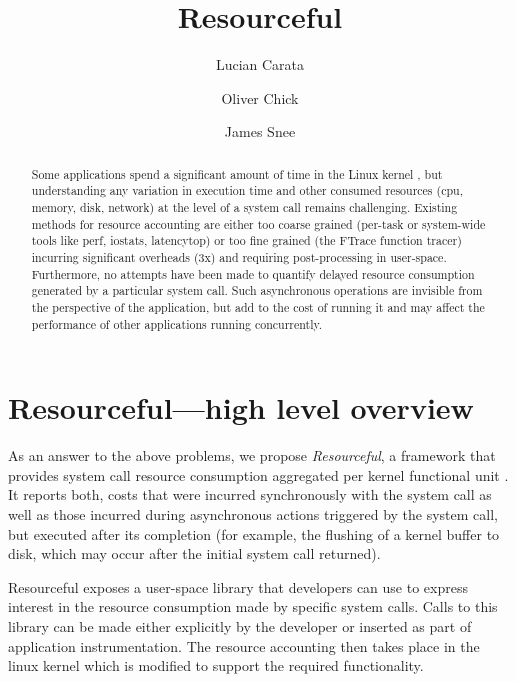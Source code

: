 \documentclass[12pt]{article}
\title{Resourceful}
\author{Lucian Carata \and Oliver Chick \and James Snee}
\date{}
\begin{document}
\maketitle{}

\begin{abstract}
Some applications spend a significant amount of time in the Linux kernel \cite{kernelscale}, but understanding any variation in execution time and other consumed resources (cpu, memory, disk, network) at the level of a system call remains challenging.
Existing methods for resource accounting are either too coarse grained (per-task or system-wide tools like perf, iostats, latencytop) or too fine grained (the FTrace function tracer) incurring significant overheads (3x) and requiring post-processing in user-space.
Furthermore, no attempts have been made to quantify delayed resource consumption generated by a particular system call. Such asynchronous operations are invisible from the perspective of the application, but add to the cost of running it and may affect the performance of other applications running concurrently.
\end{abstract}

\section{Resourceful---high level overview}
  As an answer to the above problems, we propose \emph{Resourceful}, a framework that provides system call resource consumption aggregated per kernel functional unit \cite{kernelmap}. It reports both, costs that were incurred synchronously with the system call as well as those incurred during asynchronous actions triggered by the system call, but executed after its completion (for example, the flushing of a kernel buffer to disk, which may occur after the initial system call returned).

Resourceful exposes a user-space library that developers can use to express interest in the resource consumption made by specific system calls. Calls to this library can be made either explicitly by the developer or inserted as part of application instrumentation. The resource accounting then takes place in the linux kernel which is modified to support the required functionality.
\end{document}
